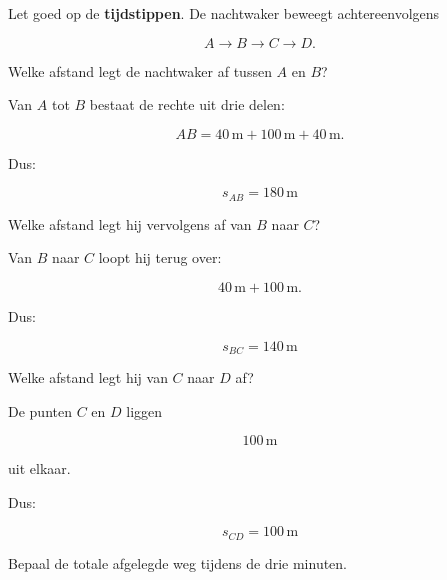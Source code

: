 \documentclass{ximera}
\begin{document}
\begin{oefening}{\oefU\ESS}
\begin{center}
  \end{center}
  
  Let goed op de \textbf{tijdstippen}. De nachtwaker beweegt achtereenvolgens
  
  \[
  A\rightarrow B\rightarrow C\rightarrow D.
  \]
  
  
  \begin{question}
  Welke afstand legt de nachtwaker af tussen $A$ en $B$?
  
  \begin{oplossing}
  Van $A$ tot $B$ bestaat de rechte uit drie delen:
  
  \[
  AB
  =
  40\,\mathrm{m}
  +
  100\,\mathrm{m}
  +
  40\,\mathrm{m}.
  \]
  
  Dus:
  
  \[
  \boxed{s_{AB}=180\,\mathrm{m}}
  \]
  \end{oplossing}
  \end{question}
  
  
  \begin{question}
  Welke afstand legt hij vervolgens af van $B$ naar $C$?
  
  \begin{oplossing}
  Van $B$ naar $C$ loopt hij terug over:
  
  \[
  40\,\mathrm{m}+100\,\mathrm{m}.
  \]
  
  Dus:
  
  \[
  \boxed{s_{BC}=140\,\mathrm{m}}
  \]
  \end{oplossing}
  \end{question}
  
  
  \begin{question}
  Welke afstand legt hij van $C$ naar $D$ af?
  
  \begin{oplossing}
  De punten $C$ en $D$ liggen
  
  \[
  100\,\mathrm{m}
  \]
  
  uit elkaar.
  
  Dus:
  
  \[
  \boxed{s_{CD}=100\,\mathrm{m}}
  \]
  \end{oplossing}
  \end{question}
  
  
  \begin{question}
  Bepaal de totale afgelegde weg tijdens de drie minuten.
  

\end{question}
\end{oefening}
\end{document}

